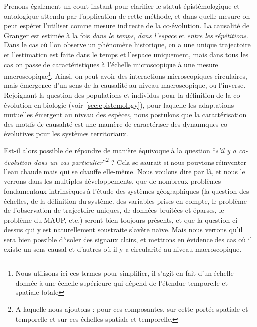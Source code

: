 
Prenons également un court instant pour clarifier le statut épistémologique et ontologique attendu par l'application de cette méthode, et dans quelle mesure on peut espérer l'utiliser comme mesure indirecte de la co-évolution. La causalité de Granger est estimée à la fois \emph{dans le temps}, \emph{dans l'espace} et \emph{entre les répétitions}. Dans le cas où l'on observe un phénomène historique, on a une unique trajectoire et l'estimation est faite dans le temps et l'espace uniquement, mais dans tous les cas on passe de caractéristiques à l'échelle microscopique à une mesure macroscopique\footnote{Nous utilisons ici ces termes pour simplifier, il s'agit en fait d'un échelle donnée à une échelle supérieure qui dépend de l'étendue temporelle et spatiale totale}. Ainsi, on peut avoir des interactions microscopiques circulaires, mais émergence d'un sens de la causalité au niveau macroscopique, ou l'inverse. Rejoignant la question des populations et individus pour la définition de la co-évolution en biologie (voir~\ref{sec:epistemology}), pour laquelle les adaptations mutuelles émergent au niveau des espèces, nous postulons que la caractérisation des motifs de causalité est une manière de caractériser des dynamiques co-évolutives pour les systèmes territoriaux.


Est-il alors possible de répondre de manière équivoque à la question ``\textit{s'il y a co-évolution dans un cas particulier}''\footnote{A laquelle nous ajoutons : pour ces composantes, sur cette portée spatiale et temporelle et sur ces échelles spatiale et temporelle.} ? Cela se saurait si nous pouvions réinventer l'eau chaude mais qui se chauffe elle-même. Nous voulons dire par là, et nous le verrons dans les multiples développements, que de nombreux problèmes fondamentaux intrinsèques à l'étude des systèmes géographiques (la question des échelles, de la définition du système, des variables prises en compte, le problème de l'observation de trajectoire uniques, de données bruitées et éparses, le problème du MAUP, etc.) seront bien toujours présents, et que la question ci-dessus qui y est naturellement soustraite s'avère naïve. Mais nous verrons qu'il sera bien possible d'isoler des signaux clairs, et mettrons en évidence des cas où il existe un sens causal et d'autres où il y a circularité au niveau macroscopique.




